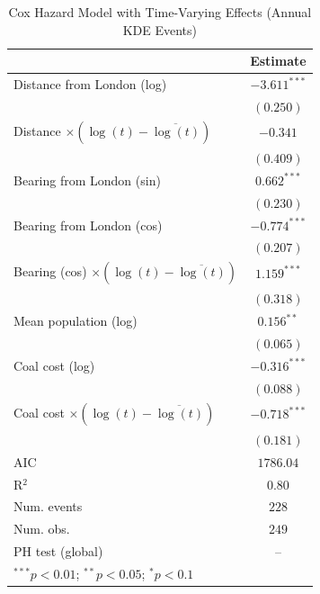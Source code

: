 
\begin{table}
\begin{center}
\begin{tabular}{l c}
\hline
 & Estimate \\
\hline
Distance from London (log) & $-3.611^{***}$ \\
 & $(0.250)$ \\
Distance $\times (\log(t)-\overline{\log(t)})$ & $-0.341$ \\
 & $(0.409)$ \\
Bearing from London (sin) & $0.662^{***}$ \\
 & $(0.230)$ \\
Bearing from London (cos) & $-0.774^{***}$ \\
 & $(0.207)$ \\
Bearing (cos) $\times (\log(t)-\overline{\log(t)})$ & $1.159^{***}$ \\
 & $(0.318)$ \\
Mean population (log) & $0.156^{**}$ \\
 & $(0.065)$ \\
Coal cost (log) & $-0.316^{***}$ \\
 & $(0.088)$ \\
Coal cost $\times (\log(t)-\overline{\log(t)})$ & $-0.718^{***}$ \\
 & $(0.181)$ \\
\hline
AIC              & $1786.04$ \\
R$^2$            & $0.80$ \\
Num. events      & $228$ \\
Num. obs.        & $249$ \\
PH test (global) & -- \\
\hline
\multicolumn{2}{l}{\scriptsize{$^{***}p<0.01$; $^{**}p<0.05$; $^{*}p<0.1$}}
\end{tabular}
\caption{Cox Hazard Model with Time-Varying Effects (Annual KDE Events)}
\label{tab:cox_tv_annual}
\end{center}
\end{table}
